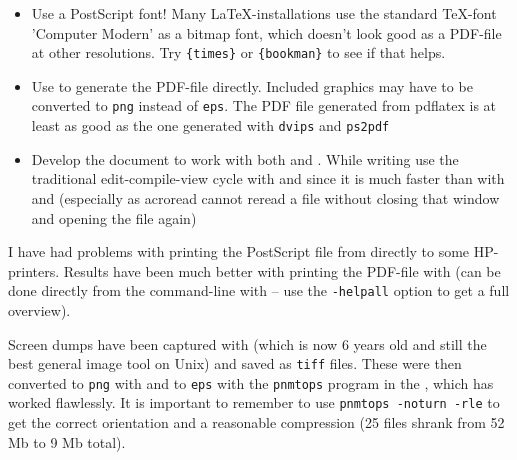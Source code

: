 \begin{itemize}
\item Use a PostScript font!  Many \LaTeX-installations use the
  standard \TeX-font 'Computer Modern' as a bitmap font, which doesn't
  look good as a PDF-file at other resolutions.   Try
  \texttt{\{times\}} or
  \texttt{\{bookman\}} to see if that helps.
\item Use  to generate the PDF-file
  directly.  Included graphics may have to be converted to
  \texttt{png} instead of \texttt{eps}.  The PDF file generated from
  pdflatex is at least as good as the one generated with
  \texttt{dvips} and \texttt{ps2pdf}
\item Develop the document to work with both  and
  .  While writing use the traditional
  edit-compile-view cycle with  and
   since it is much faster than with
   and  (especially as
  acroread cannot reread a file without closing that window and
  opening the file again)
\end{itemize}

I have had problems with printing the PostScript file from
 directly to some HP-printers.  Results have been
much better with printing the PDF-file with
 (can be done directly from the command-line with
 -- use the
\texttt{-helpall} option to get a full overview).



Screen dumps have been captured with
(which is now 6 years old and still the best general image tool on
Unix) and saved as \texttt{tiff} files.  These were then converted to
\texttt{png} with  and to \texttt{eps} with the
\texttt{pnmtops} program in the 
, which has worked flawlessly.  It is important to remember
to use \texttt{pnmtops -noturn -rle} to get the correct orientation and
a reasonable compression (25 files shrank from 52 Mb to 9 Mb total).

